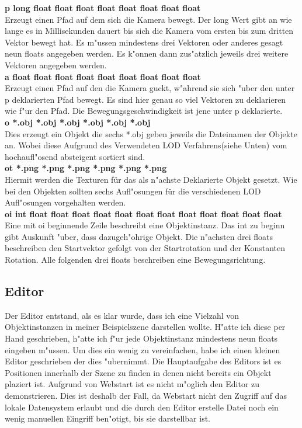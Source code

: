 \documentclass[a4paper,titlepage]{article}
\begin{document}
\textbf{p long float float float float float float float float}\\
Erzeugt einen Pfad auf dem sich die Kamera bewegt. Der long Wert gibt an wie lange es in Millisekunden dauert
bis sich die Kamera vom ersten bis zum dritten Vektor bewegt hat. Es m"ussen mindestens drei Vektoren oder anderes
gesagt neun floats angegeben werden. Es k"onnen dann zus"atzlich jeweils drei weitere Vektoren angegeben werden.\\

\textbf{a float float float float float float float float float}\\
Erzeugt einen Pfad auf den die Kamera guckt, w"ahrend sie sich "uber den unter p deklarierten Pfad bewegt.
Es sind hier genau so viel Vektoren zu deklarieren wie f"ur den Pfad. Die Bewegungsgeschwindigkeit ist jene
unter p deklarierte.\\

\textbf{o *.obj *.obj *.obj *.obj *.obj *.obj}\\
Dies erzeugt ein Objekt die sechs *.obj geben jeweils die Dateinamen der Objekte an. Wobei diese Aufgrund des
Verwendeten LOD Verfahrens(siehe Unten) vom hochaufl"osend absteigent sortiert sind.\\

\textbf{ot *.png *.png *.png *.png *.png *.png}\\
Hiermit werden die Texturen für das als n"achste Deklarierte Objekt gesetzt. Wie bei den Objekten sollten sechs
Aufl"osungen für die verschiedenen LOD Aufl"osungen vorgehalten werden.\\

\textbf{oi int float float float float float float float float float float float float}\\
Eine mit oi beginnende Zeile beschreibt eine Objektinstanz. Das int zu beginn gibt Auskunft "uber, dass
dazugeh"ohrige Objekt. Die n"achsten drei floats beschreiben den Startvektor gefolgt von der Startrotation
und der Konstanten Rotation. Alle folgenden drei floats beschreiben eine Bewegungsrichtung.\\

\subsection{Editor} 
Der Editor entstand, als es klar wurde, dass ich eine Vielzahl von Objektinstanzen in meiner Beispielszene darstellen
wollte. H"atte ich diese per Hand geschrieben, h"atte ich f"ur jede Objektinstanz mindestens neun floats eingeben m"ussen. 
Um dies ein wenig zu vereinfachen, habe ich einen kleinen Editor geschrieben der dies "ubernimmt.
Die Hauptaufgabe des Editors ist es Positionen innerhalb der Szene zu finden in denen nicht bereits ein Objekt
plaziert ist. Aufgrund von Webstart ist es nicht m"oglich den Editor zu demonstrieren. Dies ist deshalb der Fall, 
da Webstart nicht den Zugriff auf das lokale Datensystem erlaubt und die durch den Editor erstelle Datei noch ein wenig
manuellen Eingriff ben"otigt, bis sie darstellbar ist.
\end{document}
